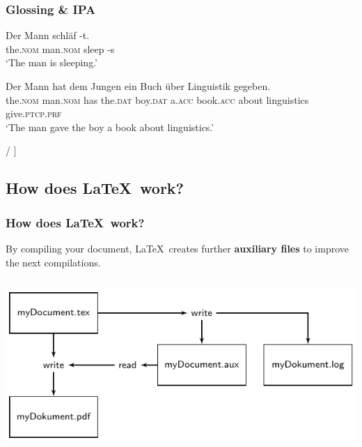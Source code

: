 {\begin{frame}
\begin{figure}
\end{figure}

\end{frame}


\begin{frame}
\frametitle{Glossing \& IPA}

\ea 
	\ea
	\gll Der Mann schläf -t.\\
	the.\textsc{nom} man.\textsc{nom} sleep -s\\
	\glt `The man is sleeping.'

	\ex 
	\gll Der Mann hat dem Jungen ein Buch über Linguistik gegeben.\\
	the.\textsc{nom} man.\textsc{nom} has the.\textsc{dat} boy.\textsc{dat} a.\textsc{acc} book.\textsc{acc} about linguistics give.\textsc{ptcp.prf}\\
	\glt `The man gave the boy a book about linguistics.' 
	\z 
		
\ex 
	\ea {} 
	\ex {/}/ 
	\ex {[}] 
	\z 
\z 

\end{frame}


\subsection{How does \LaTeX\ work?}

\begin{frame}
\frametitle{How does \LaTeX\ work?}

By compiling your document, \LaTeX\ creates further \textbf{auxiliary files} to improve the next compilations.

\begin{columns}


\includegraphics[scale=.75]{../../texfiles-beamer/tex-material/WissArb-latex/LaTeX-flowchart-1.pdf}


\end{columns}
\end{frame}}
